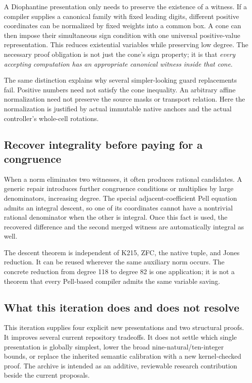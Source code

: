 \documentclass[11pt]{article}
\theoremstyle{remark}\newtheorem{remark}[theorem]{Remark}
\begin{document}
A Diophantine presentation only needs to preserve the existence of a witness. If a compiler supplies a canonical family with fixed leading digits, different positive coordinates can be normalized by fixed weights into a common box. A cone can then impose their simultaneous sign condition with one universal positive-value representation. This reduces existential variables while preserving low degree. The necessary proof obligation is not just the cone's sign property; it is that \emph{every accepting computation has an appropriate canonical witness inside that cone}.

The same distinction explains why several simpler-looking guard replacements fail. Positive numbers need not satisfy the cone inequality. An arbitrary affine normalization need not preserve the source masks or transport relation. Here the normalization is justified by actual immutable native anchors and the actual controller's whole-cell rotations.

\subsection{Recover integrality before paying for a congruence}

When a norm eliminates two witnesses, it often produces rational candidates. A generic repair introduces further congruence conditions or multiplies by large denominators, increasing degree. The special adjacent-coefficient Pell equation admits an integral descent, so one of its coordinates cannot have a nontrivial rational denominator when the other is integral. Once this fact is used, the recovered difference and the second merged witness are automatically integral as well.

The descent theorem is independent of K215, ZFC, the native tuple, and Jones reduction. It can be reused wherever the same auxiliary norm occurs. The concrete reduction from degree 118 to degree 82 is one application; it is not a theorem that every Pell-based compiler admits the same variable saving.

\subsection{What this iteration does and does not resolve}

This iteration supplies four explicit new presentations and two structural proofs. It improves several current repository tradeoffs. It does not settle which single presentation is globally simplest, lower the broad nine-natural/ten-integer bounds, or replace the inherited semantic calibration with a new kernel-checked proof. The archive is intended as an additive, reviewable research contribution beside the current proposals.
\end{document}
